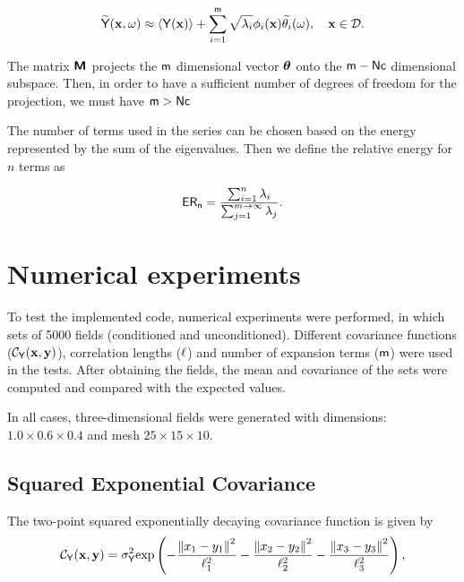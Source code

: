 \begin{equation}
  \widetilde{\mathsf{Y}}\!\left(\mathbf{x},\omega\right) \approx \langle {{\mathsf{Y}}(\mathbf{x})} \rangle +\sum_{i=1}^{\mathsf{m}}\sqrt{\lambda_{i}} \phi_{i}(\mathbf{x}) \widetilde{\theta_{i}}(\omega),
  \quad \mathbf{x} \in \mathcal{D}.
\label{klM}
\end{equation}

The matrix $\boldsymbol{\mathsf{M}}_{}$ projects the $\mathsf{m}$ dimensional vector $\boldsymbol{\theta}$ onto the $\mathsf{m} - \mathsf{Nc}$ dimensional subspace.
Then, in order to have a sufficient number of degrees of freedom for the projection, we must have $\mathsf{m} > \mathsf{Nc}$

The number of terms used in the series can be chosen based on the energy represented by the sum of the eigenvalues. 
Then we define the relative energy for $n$ terms as

\begin{equation}
 \mathsf{ER_{n}} = \dfrac{\sum_{i=1}^{n}\lambda_{i}}{\sum_{j=1}^{m\rightarrow\infty}\lambda_{j}}.
\end{equation}


\section{Numerical experiments}

To test the implemented code, numerical experiments were performed, in which sets of 5000 fields (conditioned and unconditioned). 
Different covariance functions ($\mathcal{C}_{\mathsf{Y}}(\mathbf{x}, \mathbf{y})$), correlation lengths ($\ell$) and number of expansion terms ($\mathsf{m}$) were used in the tests.
After obtaining the fields, the mean and covariance of the sets were computed and compared with the expected values.

In all cases, three-dimensional fields were generated with dimensions: $1.0 \times 0.6 \times 0.4$ and mesh $25 \times 15 \times 10$.
\subsection{Squared Exponential Covariance}
The two-point squared exponentially decaying covariance function
is given by
\begin{equation}
 \mathcal{C}_{\mathsf{Y}}(\mathbf{x}, \mathbf{y}) = {\sigma_{\mathsf{Y}}^{2}}\mbox{exp}\left(-\dfrac{\left\| x_1 - y_1 \right\|^2}{\ell_{1}^{2}}-\dfrac{\left\| x_2 - y_2 \right\|^2}{\ell_{2}^{2}}-\dfrac{\left\| x_3 - y_3 \right\|^2}{\ell_{3}^{2}}  \right),
 \label{eq-squarecov}
\end{equation}

